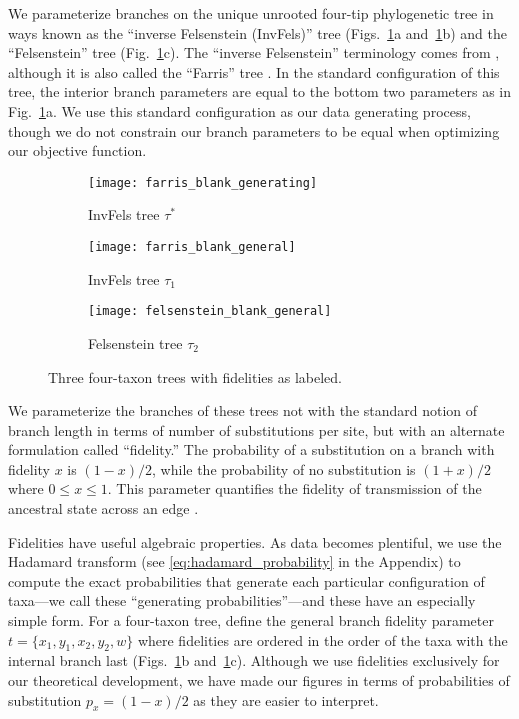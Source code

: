 \documentclass[11pt]{article}
\begin{document}
We parameterize branches on the unique unrooted four-tip phylogenetic tree in ways known as the ``inverse Felsenstein (InvFels)'' tree (Figs.~\ref{fig:farris-fels-top}a and~\ref{fig:farris-fels-top}b) and the ``Felsenstein'' tree (Fig.~\ref{fig:farris-fels-top}c).
The ``inverse Felsenstein'' terminology comes from \citet{Swofford2001-hr}, although it is also called the ``Farris'' tree \citep{Siddall1998-hq, Felsenstein2004}.
In the standard configuration of this tree, the interior branch parameters are equal to the bottom two parameters as in Fig.~\ref{fig:farris-fels-top}a.
We use this standard configuration as our data generating process, though we do not constrain our branch parameters to be equal when optimizing our objective function.

\begin{figure}
\centering
\begin{subfigure}{.32\linewidth}
\centering
\texttt{[image: farris\_blank\_generating]}
\caption[short]{InvFels tree $\tau^*$}
\end{subfigure}
\begin{subfigure}{.32\linewidth}
\centering
\texttt{[image: farris\_blank\_general]}
\caption[short]{InvFels tree $\tau_1$}
\end{subfigure}
\begin{subfigure}{.32\linewidth}
\centering
\texttt{[image: felsenstein\_blank\_general]}
\caption[short]{Felsenstein tree $\tau_2$}
\end{subfigure}
\caption{Three four-taxon trees with fidelities as labeled.}
\label{fig:farris-fels-top}
\end{figure}

We parameterize the branches of these trees not with the standard notion of branch length in terms of number of substitutions per site, but with an alternate formulation called ``fidelity.''
The probability of a substitution on a branch with fidelity $x$ is $(1-x)/2$, while the probability of no substitution is $(1+x)/2$ where $0 \le x \le 1$.
This parameter quantifies the fidelity of transmission of the ancestral state across an edge \citep{Matsen2007-jq}.

Fidelities have useful algebraic properties.
As data becomes plentiful, we use the Hadamard transform (see \eqref{eq:hadamard_probability} in the Appendix) to compute the exact probabilities that generate each particular configuration of taxa---we call these ``generating probabilities''---and these have an especially simple form.
For a four-taxon tree, define the general branch fidelity parameter $t=\{x_1,y_1,x_2,y_2,w\}$ where fidelities are ordered in the order of the taxa with the internal branch last (Figs.~\ref{fig:farris-fels-top}b and~\ref{fig:farris-fels-top}c).
Although we use fidelities exclusively for our theoretical development, we have made our figures in terms of probabilities of substitution $p_{x} = (1-x)/2$ as they are easier to interpret.
\end{document}
